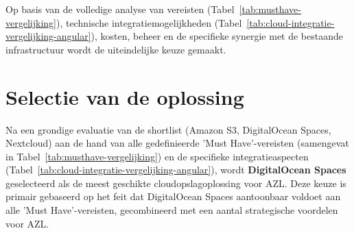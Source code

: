 Op basis van de volledige analyse van vereisten (Tabel~\ref{tab:musthave-vergelijking}), technische integratiemogelijkheden (Tabel~\ref{tab:cloud-integratie-vergelijking-angular}), kosten, beheer en de specifieke synergie met de bestaande infrastructuur wordt de uiteindelijke keuze gemaakt.

\section{Selectie van de oplossing}
Na een grondige evaluatie van de shortlist (Amazon S3, DigitalOcean Spaces, Nextcloud) aan de hand van alle gedefinieerde 'Must Have'-vereisten (samengevat in Tabel~\ref{tab:musthave-vergelijking}) en de specifieke integratieaspecten (Tabel~\ref{tab:cloud-integratie-vergelijking-angular}), wordt \textbf{DigitalOcean Spaces} geselecteerd als de meest geschikte cloudopslagoplossing voor AZL. Deze keuze is primair gebaseerd op het feit dat DigitalOcean Spaces aantoonbaar voldoet aan alle 'Must Have'-vereisten, gecombineerd met een aantal strategische voordelen voor AZL.

